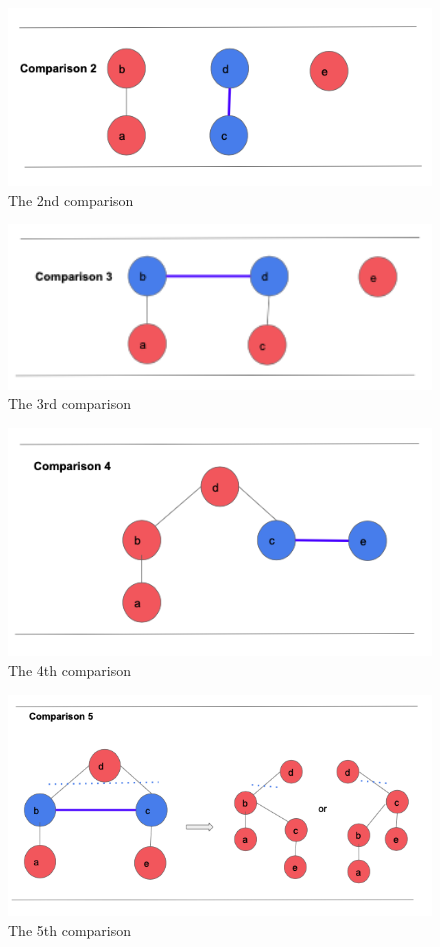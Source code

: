 \documentclass[12pt]{article}
\theoremstyle{plain}
\begin{document}
\begin{figure}[h]
\includegraphics[width=12cm]{2.png}
\centering
\caption{The 2nd comparison}
\label{BF}
\end{figure}

\begin{figure}[h]
\includegraphics[width=12cm]{3.png}
\centering
\caption{The 3rd comparison}
\label{BF}
\end{figure}

\begin{figure}[h]
\includegraphics[width=12cm]{4.png}
\centering
\caption{The 4th comparison}
\label{BF}
\end{figure}

\begin{figure}[h]
\includegraphics[width=12cm]{5.png}
\centering
\caption{The 5th comparison}
\label{BF}
\end{figure}
\end{document}
